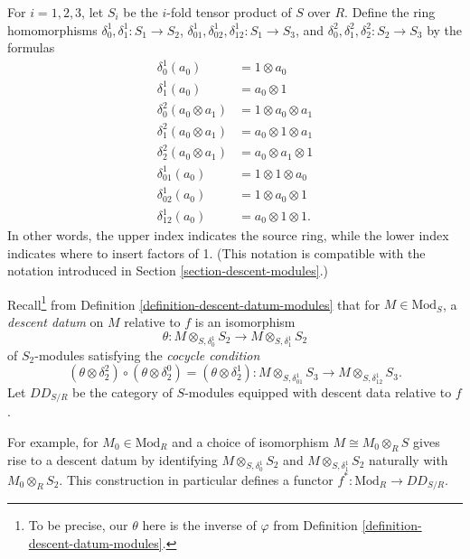 \medskip\noindent
For $i = 1, 2, 3$, let $S_i$ be the $i$-fold tensor product of $S$ over $R$.
Define the ring homomorphisms $\delta_0^1, \delta_1^1: S_1 \to S_2$,
$\delta_{01}^1, \delta_{02}^1, \delta_{12}^1: S_1 \to S_3$, and
$\delta_0^2, \delta_1^2, \delta_2^2: S_2 \to S_3$ by the formulas
\begin{align*}
\delta^1_0  (a_0) & =  1 \otimes a_0 \\
\delta^1_1  (a_0) & = a_0 \otimes 1 \\
\delta^2_0  (a_0 \otimes a_1) & =  1 \otimes a_0 \otimes a_1 \\
\delta^2_1  (a_0 \otimes a_1) & =  a_0 \otimes 1 \otimes a_1 \\
\delta^2_2  (a_0 \otimes a_1) & =  a_0 \otimes a_1 \otimes 1 \\
\delta_{01}^1(a_0) & = 1 \otimes 1 \otimes a_0 \\
\delta_{02}^1(a_0) & = 1 \otimes a_0 \otimes 1 \\
\delta_{12}^1(a_0) & = a_0 \otimes 1 \otimes 1.
\end{align*}
In other words, the upper index indicates the source ring, while the lower 
index indicates where to insert factors of 1. (This notation is compatible
with the notation introduced in Section \ref{section-descent-modules}.)

\medskip\noindent
Recall\footnote{To be precise, our $\theta$ here is the inverse of
$\varphi$ from Definition \ref{definition-descent-datum-modules}.}
from Definition \ref{definition-descent-datum-modules} that for
$M \in \text{Mod}_S$, a {\it descent datum} on $M$ relative to $f$ is
an isomorphism
$$
\theta :
M \otimes_{S,\delta^1_0} S_2
\longrightarrow
M \otimes_{S,\delta^1_1} S_2
$$
of $S_2$-modules satisfying the {\it cocycle condition}
\begin{equation}
\label{equation-cocycle-condition}
(\theta \otimes \delta_2^2) \circ (\theta \otimes \delta_2^0) = (\theta \otimes 
\delta_2^1):
M \otimes_{S, \delta^1_{01}} S_3 \to M \otimes_{S,\delta^1_{12}} S_3.
\end{equation}
Let $DD_{S/R}$ be the category of $S$-modules equipped with descent data 
relative to $f$.

\medskip\noindent
For example, for $M_0 \in \text{Mod}_R$ and a choice of isomorphism
$M \cong M_0 \otimes_R S$ gives rise to a descent datum by identifying
$M \otimes_{S,\delta^1_0} S_2$ and $M \otimes_{S,\delta^1_1} S_2$
naturally with $M_0 \otimes_R S_2$. This construction in particular
defines a functor $f^*: \text{Mod}_R \to DD_{S/R}$.

